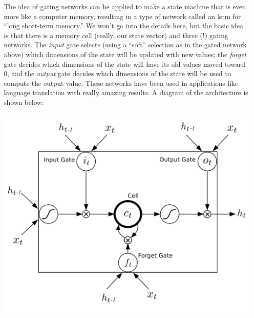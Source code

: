 The idea of gating networks can be applied to make a state machine
that is even more like a computer memory, resulting in a type of
network called an {\sc  lstm} for ``long short-term memory.''
  We won't go
into the details here,  but the basic idea is that there is a memory
cell (really, our state vector) and three (!) gating networks.  The
  {\em input} gate selects (using a ``soft''  selection as in the gated
network above) which dimensions of the state will be updated  with new
values;  the {\em forget} gate decides which dimensions of the state
will have its old values  moved toward 0, and the {\em  output} gate
decides which dimensions of the state will be used to compute the
output value.  These networks have been used in applications like
language translation with really amazing results.  A diagram of the
architecture is shown below:
\begin{center}
  \includegraphics[scale = 0.7]{figures/lstm.png}
\end{center}



